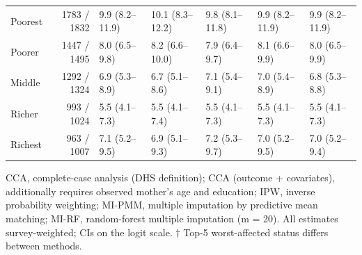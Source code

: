 \documentclass[11pt,a4paper]{article}
\begin{document}
\begin{landscape}
\begin{longtable}{l|rlllll}
\midrule\addlinespace[2.5pt]
\multicolumn{7}{l}{Wasting — Wealth quintile} \\[2.5pt] 
\midrule\addlinespace[2.5pt]
Poorest & 1783 / 1832 & 9.9 (8.2–11.9) & 10.1 (8.3–12.2) & 9.8 (8.1–11.8) & 9.9 (8.2–11.9) & 9.9 (8.2–11.9) \\ 
Poorer & 1447 / 1495 & 8.0 (6.5–9.8) & 8.2 (6.6–10.0) & 7.9 (6.4–9.7) & 8.1 (6.6–9.9) & 8.0 (6.5–9.9) \\ 
Middle & 1292 / 1324 & 6.9 (5.3–8.9) & 6.7 (5.1–8.6) & 7.1 (5.4–9.1) & 7.0 (5.4–8.9) & 6.8 (5.3–8.8) \\ 
Richer & 993 / 1024 & 5.5 (4.1–7.3) & 5.5 (4.1–7.4) & 5.5 (4.1–7.3) & 5.5 (4.1–7.3) & 5.5 (4.1–7.3) \\ 
Richest & 963 / 1007 & 7.1 (5.2–9.5) & 6.9 (5.1–9.3) & 7.2 (5.3–9.7) & 7.0 (5.2–9.5) & 7.0 (5.2–9.4) \\ 
\bottomrule
\end{longtable}
\begin{minipage}{\linewidth}
\vspace{.05em}
CCA, complete-case analysis (DHS definition); CCA (outcome + covariates), additionally requires observed mother's age and education; IPW, inverse probability weighting; MI-PMM, multiple imputation by predictive mean matching; MI-RF, random-forest multiple imputation (m = 20). All estimates survey-weighted; CIs on the logit scale. $\dagger$ Top-5 worst-affected status differs between methods.\\
\end{minipage}
\endgroup

\end{landscape}
\clearpage
\end{document}
